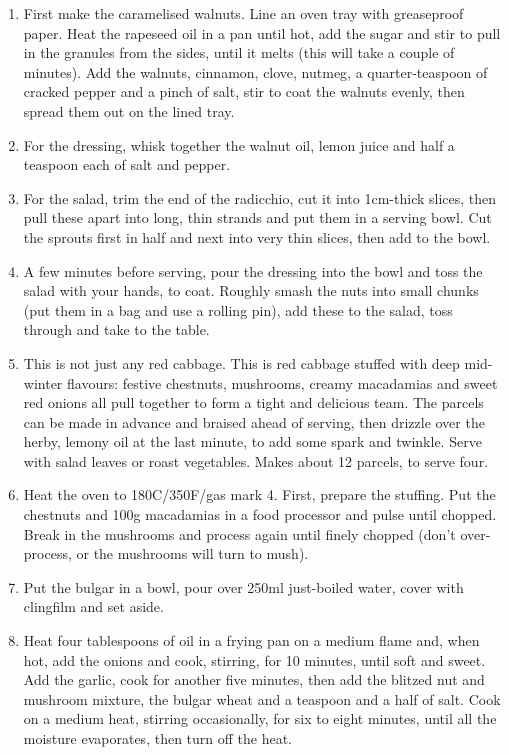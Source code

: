 \documentclass{book}
\begin{document}
\begin{enumerate}
\item First make the caramelised walnuts. Line an oven tray with greaseproof paper. Heat the rapeseed oil in a pan until hot, add the sugar and stir to pull in the granules from the sides, until it melts (this will take a couple of minutes). Add the walnuts, cinnamon, clove, nutmeg, a quarter-teaspoon of cracked pepper and a pinch of salt, stir to coat the walnuts evenly, then spread them out on the lined tray.
\item For the dressing, whisk together the walnut oil, lemon juice and half a teaspoon each of salt and pepper.
\item For the salad, trim the end of the radicchio, cut it into 1cm-thick slices, then pull these apart into long, thin strands and put them in a serving bowl. Cut the sprouts first in half and next into very thin slices, then add to the bowl.
\item A few minutes before serving, pour the dressing into the bowl and toss the salad with your hands, to coat. Roughly smash the nuts into small chunks (put them in a bag and use a rolling pin), add these to the salad, toss through and take to the table.
\item This is not just any red cabbage. This is red cabbage stuffed with deep mid-winter flavours: festive chestnuts, mushrooms, creamy macadamias and sweet red onions all pull together to form a tight and delicious team. The parcels can be made in advance and braised ahead of serving, then drizzle over the herby, lemony oil at the last minute, to add some spark and twinkle. Serve with salad leaves or roast vegetables. Makes about 12 parcels, to serve four.
\item Heat the oven to 180C/350F/gas mark 4. First, prepare the stuffing. Put the chestnuts and 100g macadamias in a food processor and pulse until chopped. Break in the mushrooms and process again until finely chopped (don’t over-process, or the mushrooms will turn to mush).
\item Put the bulgar in a bowl, pour over 250ml just-boiled water, cover with clingfilm and set aside.
\item Heat four tablespoons of oil in a frying pan on a medium flame and, when hot, add the onions and cook, stirring, for 10 minutes, until soft and sweet. Add the garlic, cook for another five minutes, then add the blitzed nut and mushroom mixture, the bulgar wheat and a teaspoon and a half of salt. Cook on a medium heat, stirring occasionally, for six to eight minutes, until all the moisture evaporates, then turn off the heat.

\end{enumerate}
\end{document}
